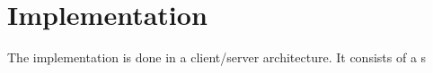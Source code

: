 

\section{Implementation}
The implementation is done in a client/server architecture. It consists of a s